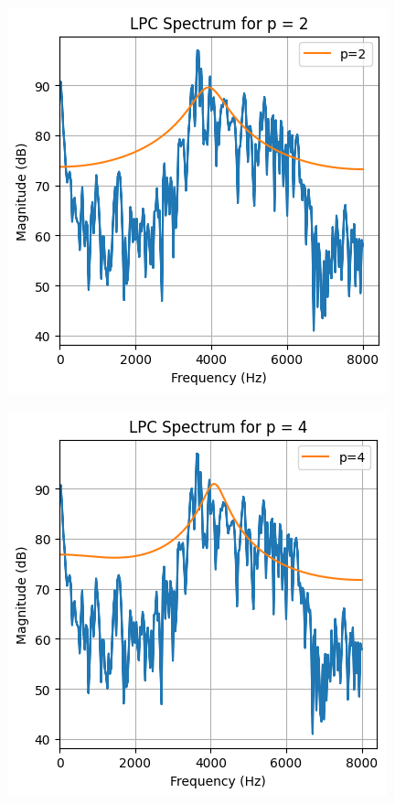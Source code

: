 \documentclass{article}
\begin{document}
\begin{figure}[H]
\begin{center}
\includegraphics[scale = 0.8]{2p2.png}
\end{center}
\end{figure}

\begin{figure}[H]
\begin{center}
\includegraphics[scale = 0.8]{4p2.png}
\end{center}
\end{figure}
\end{document}
